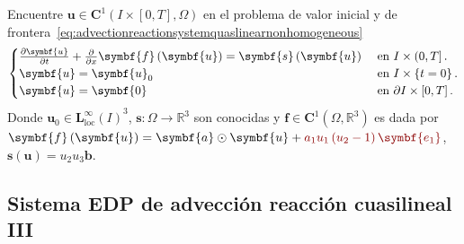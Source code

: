 Encuentre
\begin{math}
	\symbf{u}\in
	\symbf{C}^{1}\left(I\times\left[0,T\right],\Omega\right)
\end{math}
en el problema de valor inicial y de frontera~\eqref{eq:advectionreactionsystemquaslinearnonhomogeneous}
\begin{equation}\label{eq:advectionreactionsystemquaslinearnonhomogeneous}
	\begin{cases}
		\diffp{\symbf{u}}{t}+\diffp{}{x}\symbf{f}\left(\symbf{u}\right)=
		\symbf{s}\left(\symbf{u}\right) & \text{ en }I\times\left(0,T\right].          \\
		\symbf{u}                                                      =
		\symbf{u}_{0}                   & \text{ en }I\times\left\{t=0\right\}.        \\
		\symbf{u}                                                       =
		\symbf{0}                       & \text{ en }\partial I\times\left[0,T\right].
	\end{cases}
\end{equation}
Donde
\begin{math}
	\symbf{u}_{0}\in
	{\symbf{L}^{\infty}_{\text{loc}}\left(I\right)}^{3}
\end{math},
\begin{math}
	\symbf{s}\colon\Omega\to
	\mathbb{R}^{3}
\end{math}
son conocidas y
\begin{math}
	\symbf{f}\in
	\symbf{C}^{1}\left(\Omega,\mathbb{R}^{3}\right)
\end{math}
es dada por
\begin{math}
	\symbf{f}\left(\symbf{u}\right)=
	\symbf{a}\odot\symbf{u}+
	\mathcolor{DarkRed}{a_{1}u_{1}\left(u_{2}-1\right)\symbf{e_{1}}}
\end{math},
\begin{math}
	\symbf{s}\left(\symbf{u}\right)=
	u_{2}u_{3}\symbf{b}
\end{math}.

\subsection*{Sistema EDP de advección reacción cuasilineal III}

